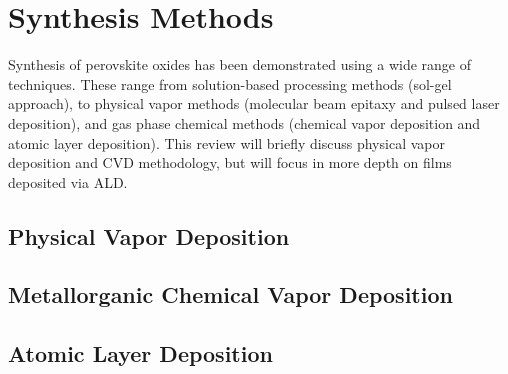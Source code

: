 \chapter{Synthesis Methods}
\label{chap:synthesis}
\thispagestyle{empty}


Synthesis of perovskite oxides has been demonstrated using a wide range of techniques. These range from solution-based processing methods (sol-gel approach), to physical vapor methods (molecular beam epitaxy and pulsed laser deposition), and gas phase chemical methods (chemical vapor deposition and atomic layer deposition). This review will briefly discuss physical vapor deposition and CVD methodology, but will focus in more depth on films deposited via ALD. 

%
%
%

\section{Physical Vapor Deposition}

\lipsum


\section{Metallorganic Chemical Vapor Deposition}

\lipsum


\section{Atomic Layer Deposition}
	
